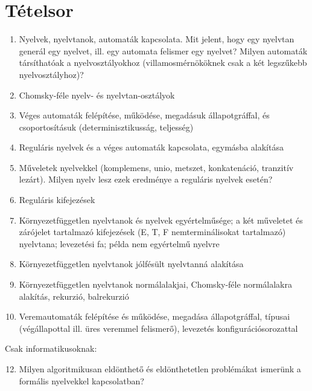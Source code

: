 \documentclass[a4paper]{article}
\begin{document}
\section{Tételsor}

\begin{enumerate}
    \item Nyelvek, nyelvtanok, automaták kapcsolata. Mit jelent, hogy
        egy nyelvtan generál egy nyelvet, ill. egy automata felismer egy
        nyelvet? Milyen automaták társíthatóak a nyelvosztályokhoz
        (villamosmérnököknek csak a két legszűkebb nyelvosztályhoz)?
    \item Chomsky-féle nyelv- és nyelvtan-osztályok
    \item Véges automaták felépítése, működése, megadásuk
        állapotgráffal, és csoportosításuk (determinisztikusság,
        teljesség)
    \item Reguláris nyelvek és a véges automaták kapcsolata, egymásba
        alakítása
    \item Műveletek nyelvekkel (komplemens, unio, metszet, konkatenáció,
        tranzitív lezárt). Milyen nyelv lesz ezek eredménye a reguláris
        nyelvek esetén?
    \item Reguláris kifejezések
    \item Környezetfüggetlen nyelvtanok és nyelvek egyértelműsége; a két
        műveletet és zárójelet tartalmazó kifejezések (E, T, F
        nemterminálisokat tartalmazó) nyelvtana; levezetési fa; példa
        nem egyértelmű nyelvre
    \item Környezetfüggetlen nyelvtanok jólfésült nyelvtanná alakítása
    \item Környezetfüggetlen nyelvtanok normálalakjai, Chomsky-féle
        normálalakra alakítás, rekurzió, balrekurzió
    \item Veremautomaták felépítése és működése, megadása
        állapotgráffal, típusai (végállapottal ill. üres veremmel
        felismerő), levezetés konfigurációsorozattal
\end{enumerate}

\hrulefill

Csak informatikusoknak:

\begin{enumerate}
    \setcounter{enumi}{11}
    \item Milyen algoritmikusan eldönthető és eldönthetetlen problémákat
        ismerünk a formális nyelvekkel kapcsolatban?
\end{enumerate}


\newpage
\tableofcontents
\end{document}
